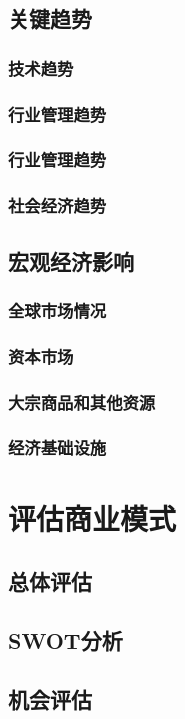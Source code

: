 \documentclass[a4paper]{ctexart}
\begin{document}
\subsection{关键趋势}
\subsubsection{技术趋势}
\subsubsection{行业管理趋势}
\subsubsection{行业管理趋势}
\subsubsection{社会经济趋势}

\subsection{宏观经济影响}
\subsubsection{全球市场情况}
\subsubsection{资本市场}
\subsubsection{大宗商品和其他资源}
\subsubsection{经济基础设施}
\section{评估商业模式}
\subsection{总体评估}
\subsection{SWOT分析}
\subsection{机会评估}
\end{document}
